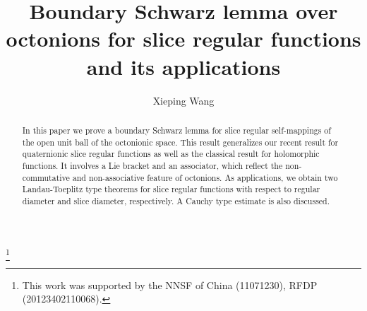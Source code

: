 \documentclass{amsart}
\theoremstyle{definition}
\theoremstyle{remark}
\numberwithin{equation}{section}
\begin{document}
\title[Boundary Schwarz lemma   and its applications]
{Boundary Schwarz lemma over octonions for slice regular functions and its applications}

\author[X. P. Wang]{Xieping Wang}
\address{Xieping Wang, Department of Mathematics, University of Science and
Technology of China, Hefei 230026, China}


\thanks{This work was supported by the NNSF  of China (11071230), RFDP (20123402110068).}


\begin{abstract}
In this paper we prove a boundary Schwarz lemma for slice regular self-mappings of the open unit ball  of the octonionic space. This result generalizes our recent result for quaternionic slice regular functions as well as the classical result  for holomorphic functions. It  involves  a Lie bracket and  an associator, which reflect the non-commutative and non-associative feature of octonions.
As applications, we obtain two Landau-Toeplitz type theorems for slice regular functions with respect to regular diameter and slice diameter, respectively. A Cauchy type estimate is also discussed.
\end{abstract}

\maketitle
\end{document}
